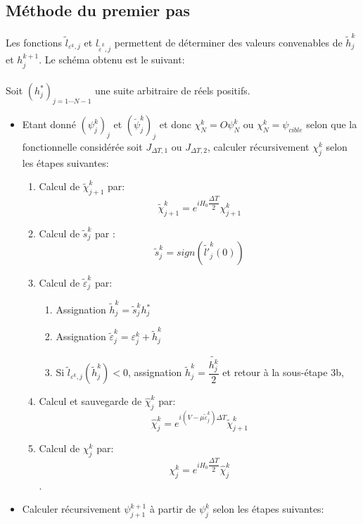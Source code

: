 \subsection{Méthode du premier pas}

Les fonctions $\tilde{l}_{\varepsilon^k,j}$ et $l_{\tilde{\varepsilon}^k,j}$ permettent de déterminer des valeurs convenables de $\tilde{h}_j^k$ et $h_j^{k+1}$. Le schéma obtenu est le suivant:
\\
\\

Soit $(h_j^*)_{j = 1\cdots N-1}$ une suite arbitraire de réels positifs.

\begin{itemize}
	\item[\textbullet] Etant donné $(\psi_j^k)_j$ et $(\breve{\psi}_j^k)_j$ et donc $\chi_N^k = O\psi_N^k$ ou $\chi_N^k = \psi_{cible}$ selon que la fonctionnelle considérée soit $J_{\Delta T,1}$ ou $J_{\Delta T, 2}$, calculer récursivement $\chi_{j}^k$ selon les étapes suivantes:
	
	\begin{enumerate}
		\item Calcul de $\tilde{\chi}_{j+1}^k $ par: $$\tilde{\chi}_{j+1}^k= e^{iH_0 \dfrac{\Delta T}{2}} \chi_{j+1}^k$$
		\item Calcul de $\tilde{s}_j^k$ par :
		$$\tilde{s}_j^k = sign(\tilde{l'}_j^{k}(0))$$
		\item Calcul de $\tilde{\varepsilon}_j^k$ par:
		
		\begin{enumerate}
			\item Assignation $\tilde{h}_j^k= \tilde{s}_j^k h_j^*$
			\item Assignation $\tilde{\varepsilon}_j^k = \varepsilon_j^k + \tilde{h}_j^k$
			\item Si $\tilde{l}_{\varepsilon^k,j}(\tilde{h}_j^k)<0$, assignation $\tilde{h}_j^k = \dfrac{\tilde{h_j^k}}{2}$ et retour à la sous-étape 3b,
		\end{enumerate}
		
		\item Calcul et sauvegarde de $\widehat{\chi}_j^k$ par: $$\widehat{\chi}_j^k = e^{i(V-\mu \tilde{\varepsilon}_j^k)\Delta T} \tilde{\chi}_{j+1}^k$$
		
		\item Calcul de $\chi_j^k$ par:
		$$\chi_j^k = e^{iH_0 \dfrac{\Delta T}{2}} \widehat{\chi}_j^k$$.		
	\end{enumerate}
	\item[\textbullet] Calculer récursivement $\psi_{j+1}^{k+1}$ à partir de $\psi_j^k$ selon les étapes suivantes:
	

\end{itemize}
